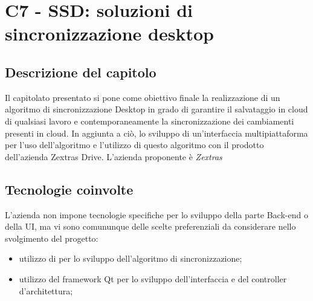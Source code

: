 \section{C7 - SSD: soluzioni di sincronizzazione desktop}

\subsection{Descrizione del capitolo}
Il capitolato presentato si pone come obiettivo finale la realizzazione di un algoritmo di sincronizzazione Desktop in grado di garantire il salvataggio in cloud di qualsiasi lavoro e contemporaneamente la sincronizzazione dei cambiamenti presenti in cloud. In aggiunta a ciò, lo sviluppo di un'interfaccia multipiattaforma per l'uso dell'algoritmo e l'utilizzo di questo algoritmo con il prodotto dell'azienda Zextras Drive.
L'azienda proponente è \textit{Zextras}

\subsection{Tecnologie coinvolte}
L'azienda non impone tecnologie specifiche per lo sviluppo della parte Back-end o della UI, ma vi sono comununque delle scelte preferenziali da considerare nello svolgimento del progetto:
\begin{itemize}
\item utilizzo di  per lo sviluppo dell'algoritmo di sincronizzazione;
\item utilizzo del framework Qt per lo sviluppo dell'interfaccia e del controller d'architettura;
\end{itemize}

